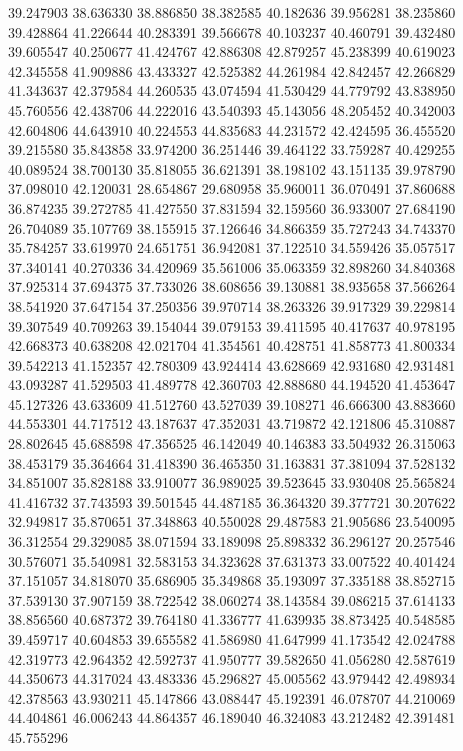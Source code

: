 39.247903
38.636330
38.886850
38.382585
40.182636
39.956281
38.235860
39.428864
41.226644
40.283391
39.566678
40.103237
40.460791
39.432480
39.605547
40.250677
41.424767
42.886308
42.879257
45.238399
40.619023
42.345558
41.909886
43.433327
42.525382
44.261984
42.842457
42.266829
41.343637
42.379584
44.260535
43.074594
41.530429
44.779792
43.838950
45.760556
42.438706
44.222016
43.540393
45.143056
48.205452
40.342003
42.604806
44.643910
40.224553
44.835683
44.231572
42.424595
36.455520
39.215580
35.843858
33.974200
36.251446
39.464122
33.759287
40.429255
40.089524
38.700130
35.818055
36.621391
38.198102
43.151135
39.978790
37.098010
42.120031
28.654867
29.680958
35.960011
36.070491
37.860688
36.874235
39.272785
41.427550
37.831594
32.159560
36.933007
27.684190
26.704089
35.107769
38.155915
37.126646
34.866359
35.727243
34.743370
35.784257
33.619970
24.651751
36.942081
37.122510
34.559426
35.057517
37.340141
40.270336
34.420969
35.561006
35.063359
32.898260
34.840368
37.925314
37.694375
37.733026
38.608656
39.130881
38.935658
37.566264
38.541920
37.647154
37.250356
39.970714
38.263326
39.917329
39.229814
39.307549
40.709263
39.154044
39.079153
39.411595
40.417637
40.978195
42.668373
40.638208
42.021704
41.354561
40.428751
41.858773
41.800334
39.542213
41.152357
42.780309
43.924414
43.628669
42.931680
42.931481
43.093287
41.529503
41.489778
42.360703
42.888680
44.194520
41.453647
45.127326
43.633609
41.512760
43.527039
39.108271
46.666300
43.883660
44.553301
44.717512
43.187637
47.352031
43.719872
42.121806
45.310887
28.802645
45.688598
47.356525
46.142049
40.146383
33.504932
26.315063
38.453179
35.364664
31.418390
36.465350
31.163831
37.381094
37.528132
34.851007
35.828188
33.910077
36.989025
39.523645
33.930408
25.565824
41.416732
37.743593
39.501545
44.487185
36.364320
39.377721
30.207622
32.949817
35.870651
37.348863
40.550028
29.487583
21.905686
23.540095
36.312554
29.329085
38.071594
33.189098
25.898332
36.296127
20.257546
30.576071
35.540981
32.583153
34.323628
37.631373
33.007522
40.401424
37.151057
34.818070
35.686905
35.349868
35.193097
37.335188
38.852715
37.539130
37.907159
38.722542
38.060274
38.143584
39.086215
37.614133
38.856560
40.687372
39.764180
41.336777
41.639935
38.873425
40.548585
39.459717
40.604853
39.655582
41.586980
41.647999
41.173542
42.024788
42.319773
42.964352
42.592737
41.950777
39.582650
41.056280
42.587619
44.350673
44.317024
43.483336
45.296827
45.005562
43.979442
42.498934
42.378563
43.930211
45.147866
43.088447
45.192391
46.078707
44.210069
44.404861
46.006243
44.864357
46.189040
46.324083
43.212482
42.391481
45.755296
